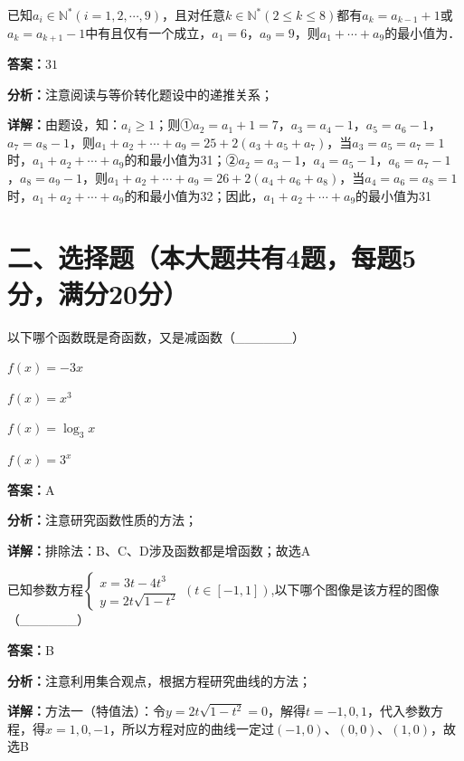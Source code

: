 \begin{question}[points=5]
已知$a_i\in\mathbb{N}^* (i=1,2,\cdots,9)$，且对任意$k\in\mathbb{N}^* (2\le k\le 8)$都有$a_k=a_{k-1}+1$或$a_k=a_{k+1}-1$中有且仅有一个成立，$a_1=6$，$a_9=9$，则$a_1+\cdots+a_9$的最小值为．
\fillin[{$31$}]
\begin{solution}
\textbf{答案：}$31$

\textbf{分析：}注意阅读与等价转化题设中的递推关系；

\textbf{详解：}由题设，知：$a_i\ge 1$；则①$a_2=a_1+1=7$，$a_3=a_4-1$，$a_5=a_6-1$，$a_7=a_8-1$，则$a_1+a_2+\cdots+a_9=25+2(a_3+a_5+a_7)$，当$a_3=a_5=a_7=1$时，$a_1+a_2+\cdots+a_9$的和最小值为31；②$a_2=a_3-1$，$a_4=a_5-1$，$a_6=a_7-1$，$a_8=a_9-1$，则$a_1+a_2+\cdots+a_9=26+2(a_4+a_6+a_8)$，当$a_4=a_6=a_8=1$时，$a_1+a_2+\cdots+a_9$的和最小值为32；因此，$a_1+a_2+\cdots+a_9$的最小值为31
\end{solution}
\end{question}

\section*{二、选择题（本大题共有4题，每题5分，满分20分）}

\begin{question}[points=5]
以下哪个函数既是奇函数，又是减函数（\_\_\_\_\_\_）
\begin{choices}
  \item $f(x)=-3x$
  \item $f(x)=x^3$
  \item $f(x)=\log_3x$
  \item $f(x)=3^x$
\end{choices}
\begin{solution}
\textbf{答案：}A

\textbf{分析：}注意研究函数性质的方法；

\textbf{详解：}排除法：B、C、D涉及函数都是增函数；故选A
\end{solution}
\end{question}

\begin{question}[points=5]
已知参数方程$\begin{cases}x=3t-4t^3\\y=2t\sqrt{1-t^2}\end{cases}(t\in[-1,1])$,以下哪个图像是该方程的图像（\_\_\_\_\_\_）
\begin{choices}
\end{choices}
\begin{solution}
\textbf{答案：}B

\textbf{分析：}注意利用集合观点，根据方程研究曲线的方法；

\textbf{详解：}方法一（特值法）：令$y=2t\sqrt{1-t^2}=0$，解得$t=-1,0,1$，代入参数方程，得$x=1,0,-1$，所以方程对应的曲线一定过$(-1,0)$、$(0,0)$、$(1,0)$，故选B
\end{solution}
\end{question}

